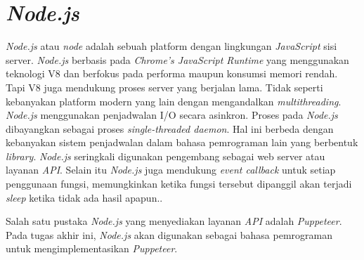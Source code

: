 	\section{\textit{Node.js}}
		\textit{Node.js} atau \textit{node} adalah sebuah platform dengan lingkungan \textit{JavaScript} sisi server.\textit{ Node.js} berbasis pada \textit{Chrome's JavaScript Runtime} yang menggunakan teknologi V8 dan berfokus pada performa maupun konsumsi memori rendah. Tapi V8 juga mendukung proses server yang berjalan lama. Tidak seperti kebanyakan platform modern yang lain dengan mengandalkan \textit{multithreading}. \textit{Node.js} menggunakan penjadwalan I/O secara asinkron. Proses pada \textit{Node.js} dibayangkan sebagai proses \textit{single-threaded daemon}. Hal ini berbeda dengan kebanyakan sistem penjadwalan dalam bahasa pemrograman lain yang berbentuk \textit{library}. \textit{Node.js} seringkali digunakan pengembang sebagai web server atau layanan \textit{API}. Selain itu \textit{Node.js} juga mendukung \textit{event callback} untuk setiap penggunaan fungsi, memungkinkan ketika fungsi tersebut dipanggil akan terjadi \textit{sleep} ketika tidak ada hasil apapun.\cite{nodejs}\cite{nodejs_2}.
		
	 	\indent Salah satu pustaka \textit{Node.js} yang menyediakan layanan \textit{API} adalah \textit{Puppeteer}. Pada tugas akhir ini, \textit{Node.js} akan digunakan sebagai bahasa pemrograman untuk mengimplementasikan \textit{Puppeteer}.
		

